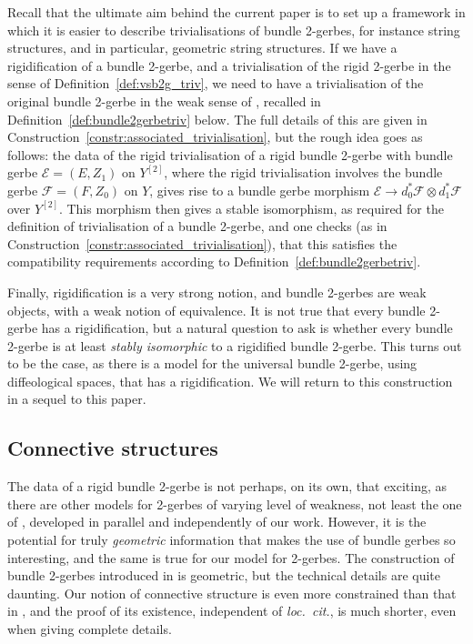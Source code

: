 \documentclass[12pt]{amsart}
\theoremstyle{plain}
\theoremstyle{definition}
\theoremstyle{remark}
\numberwithin{equation}{section}
\newcommand{\cE}{{\mathcal E}}
\newcommand{\cF}{{\mathcal F}}
\newcommand{\<}{\langle}
\renewcommand{\>}{\rangle}
\begin{document}
Recall that the ultimate aim behind the current paper is to set up a framework in which it is easier to describe trivialisations of bundle 2-gerbes, for instance string structures, and in particular, geometric string structures.
If we have a rigidification of a bundle 2-gerbe, and a trivialisation of the rigid 2-gerbe in the sense of Definition~\ref{def:vsb2g_triv}, we need to have a trivialisation of the original bundle 2-gerbe in the weak sense of \cite[Definition~11.1]{Ste}, recalled in Definition~\ref{def:bundle2gerbetriv} below. 
The full details of this are given in Construction~\ref{constr:associated_trivialisation}, but the rough idea goes as follows: the data of the rigid trivialisation of a rigid bundle 2-gerbe with bundle gerbe $\cE = (E,Z_1)$ on $Y^{[2]}$, where the rigid trivialisation involves the bundle gerbe $\cF = (F,Z_0)$ on $Y$, gives rise to a bundle gerbe morphism $\cE \to d_0^*\cF \otimes d_1^*\cF$ over $Y^{[2]}$. 
This morphism then gives a stable isomorphism, as required for the definition of trivialisation of a bundle 2-gerbe, and one checks (as in Construction~\ref{constr:associated_trivialisation}), that this satisfies the compatibility requirements according to Definition~\ref{def:bundle2gerbetriv}.


Finally, rigidification is a very strong notion, and bundle 2-gerbes are weak objects, with a weak notion of equivalence. It is not true that every bundle 2-gerbe has a rigidification, but a natural question to ask is whether every bundle 2-gerbe is at least \emph{stably isomorphic} to a rigidified bundle 2-gerbe. 
This turns out to be the case, as there is a model for the universal bundle 2-gerbe, using diffeological spaces, that has a rigidification.
We will return to this construction in a sequel to this paper.




\subsection{Connective structures}\label{subsec:conn_structure}

The data of a rigid bundle 2-gerbe is not perhaps, on its own, that exciting, as there are other models for 2-gerbes of varying level of weakness, not least the one of \cite{KM19}, developed in parallel and independently of our work. 
However, it is the potential for truly \emph{geometric} information that makes the use of bundle gerbes so interesting, and the same is true for our model for 2-gerbes. 
The construction of bundle 2-gerbes introduced in \cite{StevPhD} is geometric, but the technical details are quite daunting. 
Our notion of connective structure is even more constrained than that in \cite{StevPhD}, and the proof of its existence, independent of \emph{loc.\ cit.}, is much shorter, even when giving complete details.
\end{document}
